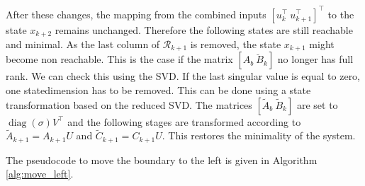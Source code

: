 \documentclass[doctype=mastersthesis,BCOR=15mm,biblatex]{ldvbook}%
\DeclareMathOperator{\diag}{diag}
\newcommand{\R}{\mathcal{R}} %
\begin{document}
After these changes, the mapping from the combined inputs $[u_k^\top \: u_{k+1}^\top]^\top$
to the state $x_{k+2}$ remains unchanged. Therefore the following states are still reachable and minimal. 
As the last column of $\R_{k+1}$ is removed, the state $x_{k+1}$ might become non reachable.
This is the case if the matrix $[A_b \: \breve{B}_k]$ no longer has full rank.
We can check this using the SVD. 
If the last singular value is equal to zero, one statedimension has to be removed. 
This can be done using a state transformation based on the reduced SVD. 
The matrices $[\tilde{A}_b \: \tilde{B}_k]$ are set to $\diag(\sigma) V^\top$ and 
the following stages are transformed according to $\tilde{A}_{k+1} = A_{k+1}U$ and $\tilde{C}_{k+1} = C_{k+1} U$.
This restores the minimality of the system.

The pseudocode to move the boundary to the left is given in Algorithm\,\ref{alg:move_left}.
 
\end{document}
